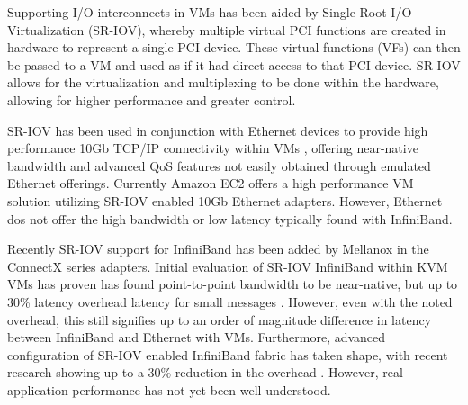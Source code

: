 \documentclass{sigplanconf}
\begin{document}
Supporting I/O interconnects in VMs has been aided by Single Root I/O Virtualization (SR-IOV), whereby multiple virtual PCI functions are created in hardware to represent a single PCI device. These virtual functions (VFs) can then be passed to a VM and used as if it had direct access to that PCI device. SR-IOV allows for the virtualization and multiplexing to be done within the hardware, allowing for higher performance and greater control. 

SR-IOV has been used in conjunction with Ethernet devices to provide high performance 10Gb TCP/IP connectivity within VMs \cite{Liu2010}, offering near-native bandwidth and advanced QoS features not easily obtained through emulated Ethernet offerings. Currently Amazon EC2 offers a high performance VM solution utilizing SR-IOV enabled 10Gb Ethernet adapters. However, Ethernet dos not offer the high bandwidth or low latency typically found with InfiniBand. 

Recently SR-IOV support for InfiniBand has been added by Mellanox in the ConnectX series adapters. Initial evaluation of SR-IOV InfiniBand within KVM VMs has proven has found point-to-point bandwidth to be near-native, but up to 30\% latency overhead  latency for small messages \cite{jose2013sr, RuivoAGTKNR14}. However, even with the noted overhead, this still signifies up to an order of magnitude difference in latency between InfiniBand and Ethernet with VMs. Furthermore, advanced configuration of SR-IOV enabled InfiniBand fabric has taken shape, with recent research showing up to a 30\% reduction in the overhead \cite{Musleh2014cloud}. However, real application performance has not yet been well understood. 








\end{document}
